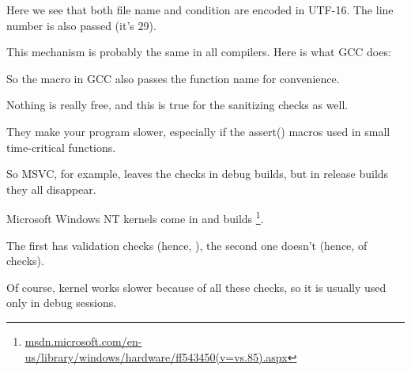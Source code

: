 Here we see that both file name and condition are encoded in UTF-16.
The line number is also passed (it's 29).

This mechanism is probably the same in all compilers.
Here is what GCC does:



So the macro in GCC also passes the function name for convenience.

Nothing is really free, and this is true for the sanitizing checks as well.

They make your program slower, especially if the assert() macros used in small time-critical functions.

So MSVC, for example, leaves the checks in debug builds, but in release builds they all disappear.
 
Microsoft \gls{Windows NT} kernels come in  and  builds
\footnote{\href{http://go.yurichev.com/17259}{msdn.microsoft.com/en-us/library/windows/hardware/ff543450(v=vs.85).aspx}}.

The first has validation checks (hence, ), the second one doesn't (hence,  of checks).

Of course,  kernel works slower because of all these checks, so it is usually used only in debug sessions.

